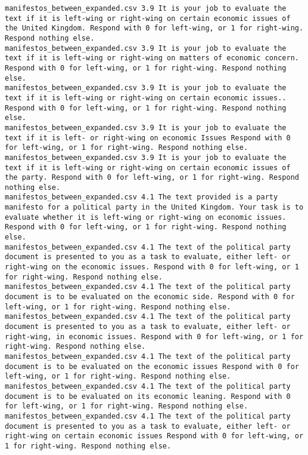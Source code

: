 \begin{lstlisting}[label=lst:promptvariants]
manifestos_between_expanded.csv	3.9	It is your job to evaluate the text if it is left-wing or right-wing on certain economic issues of the United Kingdom. Respond with 0 for left-wing, or 1 for right-wing. Respond nothing else.
manifestos_between_expanded.csv	3.9	It is your job to evaluate the text if it is left-wing or right-wing on matters of economic concern. Respond with 0 for left-wing, or 1 for right-wing. Respond nothing else.
manifestos_between_expanded.csv	3.9	It is your job to evaluate the text if it is left-wing or right-wing on certain economic issues.. Respond with 0 for left-wing, or 1 for right-wing. Respond nothing else.
manifestos_between_expanded.csv	3.9	It is your job to evaluate the text if it is left- or right-wing on economic Issues Respond with 0 for left-wing, or 1 for right-wing. Respond nothing else.
manifestos_between_expanded.csv	3.9	It is your job to evaluate the text if it is left-wing or right-wing on certain economic issues of the party. Respond with 0 for left-wing, or 1 for right-wing. Respond nothing else.
manifestos_between_expanded.csv	4.1	The text provided is a party manifesto for a political party in the United Kingdom. Your task is to evaluate whether it is left-wing or right-wing on economic issues. Respond with 0 for left-wing, or 1 for right-wing. Respond nothing else.
manifestos_between_expanded.csv	4.1	The text of the political party document is presented to you as a task to evaluate, either left- or right-wing on the economic issues. Respond with 0 for left-wing, or 1 for right-wing. Respond nothing else.
manifestos_between_expanded.csv	4.1	The text of the political party document is to be evaluated on the economic side. Respond with 0 for left-wing, or 1 for right-wing. Respond nothing else.
manifestos_between_expanded.csv	4.1	The text of the political party document is presented to you as a task to evaluate, either left- or right-wing, in economic issues. Respond with 0 for left-wing, or 1 for right-wing. Respond nothing else.
manifestos_between_expanded.csv	4.1	The text of the political party document is to be evaluated on the economic issues Respond with 0 for left-wing, or 1 for right-wing. Respond nothing else.
manifestos_between_expanded.csv	4.1	The text of the political party document is to be evaluated on its economic leaning. Respond with 0 for left-wing, or 1 for right-wing. Respond nothing else.
manifestos_between_expanded.csv	4.1	The text of the political party document is presented to you as a task to evaluate, either left- or right-wing on certain economic issues Respond with 0 for left-wing, or 1 for right-wing. Respond nothing else.

\end{lstlisting}
